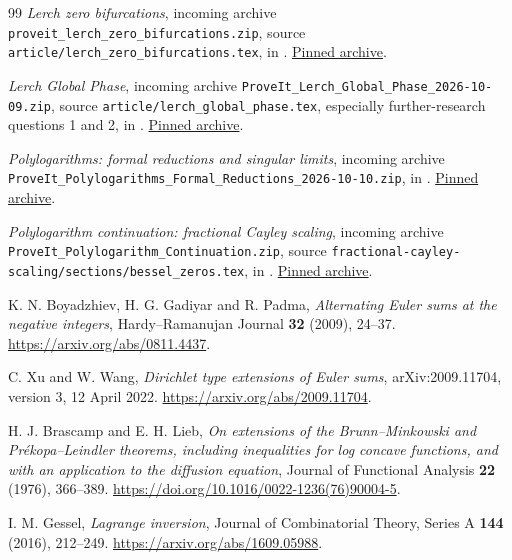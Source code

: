 \documentclass[11pt,a4paper]{article}
\theoremstyle{definition}
\theoremstyle{remark}
\numberwithin{equation}{section}
\begin{document}
\begin{thebibliography}{99}
\emph{Lerch zero bifurcations},
incoming archive \nolinkurl{proveit_lerch_zero_bifurcations.zip},
source \nolinkurl{article/lerch_zero_bifurcations.tex}, in \cite{Project}.
\href{https://github.com/VladimirReshetnikov/ProveIt/blob/a0a90ef31877f98be437191c48b46f02d5456867/docs/incoming/proveit_lerch_zero_bifurcations.zip}{Pinned archive}.

\emph{Lerch Global Phase},
incoming archive \nolinkurl{ProveIt_Lerch_Global_Phase_2026-10-09.zip},
source \nolinkurl{article/lerch_global_phase.tex},
especially further-research questions 1 and 2, in \cite{Project}.
\href{https://github.com/VladimirReshetnikov/ProveIt/blob/a0a90ef31877f98be437191c48b46f02d5456867/docs/incoming/ProveIt_Lerch_Global_Phase_2026-10-09.zip}{Pinned archive}.

\emph{Polylogarithms: formal reductions and singular limits},
incoming archive
\nolinkurl{ProveIt_Polylogarithms_Formal_Reductions_2026-10-10.zip},
in \cite{Project}.
\href{https://github.com/VladimirReshetnikov/ProveIt/blob/a0a90ef31877f98be437191c48b46f02d5456867/docs/incoming/ProveIt_Polylogarithms_Formal_Reductions_2026-10-10.zip}{Pinned archive}.

\emph{Polylogarithm continuation: fractional Cayley scaling},
incoming archive \nolinkurl{ProveIt_Polylogarithm_Continuation.zip},
source \nolinkurl{fractional-cayley-scaling/sections/bessel_zeros.tex},
in \cite{Project}.
\href{https://github.com/VladimirReshetnikov/ProveIt/blob/a0a90ef31877f98be437191c48b46f02d5456867/docs/incoming/ProveIt_Polylogarithm_Continuation.zip}{Pinned archive}.

K. N. Boyadzhiev, H. G. Gadiyar and R. Padma,
\emph{Alternating Euler sums at the negative integers},
Hardy--Ramanujan Journal \textbf{32} (2009), 24--37.
\url{https://arxiv.org/abs/0811.4437}.

C. Xu and W. Wang,
\emph{Dirichlet type extensions of Euler sums},
arXiv:2009.11704, version 3, 12 April 2022.
\url{https://arxiv.org/abs/2009.11704}.

H. J. Brascamp and E. H. Lieb,
\emph{On extensions of the Brunn--Minkowski and Pr\'ekopa--Leindler
theorems, including inequalities for log concave functions, and with
an application to the diffusion equation},
Journal of Functional Analysis \textbf{22} (1976), 366--389.
\url{https://doi.org/10.1016/0022-1236(76)90004-5}.

I. M. Gessel, \emph{Lagrange inversion},
Journal of Combinatorial Theory, Series A \textbf{144} (2016), 212--249.
\url{https://arxiv.org/abs/1609.05988}.


\end{thebibliography}
\end{document}
